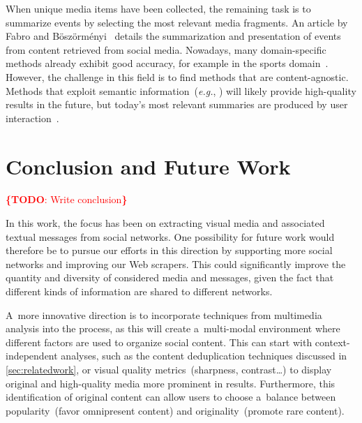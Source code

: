 \documentclass{acm_proc_article-sp}
\let\oldemph\emph
\renewcommand{\emph}[1]{\oldemph{\fontsize{9}{9}\selectfont #1}}
\newcommand{\todo}[1]{\noindent\textcolor{red}{{\bf \{TODO}: #1{\bf \}}}}
\begin{document}
When unique media items have been collected, the remaining task is to summarize events by selecting the most relevant media fragments.
An article by Fabro and B\"osz\"orm\'enyi~\cite{Fabro:MMM12} details the summarization and presentation of events from content retrieved from social media.
Nowadays, many domain-specific methods already exhibit good accuracy, for example in the sports domain~\cite{Li1,Li2}.
However, the challenge in this field is to find methods that are content-agnostic.
Methods that exploit semantic information~(\emph{e.g.}, \cite{Chen}) will likely provide high-quality results in the future,
but today's most relevant summaries are produced by user interaction~\cite{Olsen}.


\section{Conclusion and Future Work}                                        \label{sec:conclusion}
\todo{Write conclusion}

In this work, the focus has been on extracting visual media and associated textual messages from social networks.
One possibility for future work would therefore be to pursue our efforts in this direction by supporting more social networks and improving our Web scrapers.
This could significantly improve the quantity and diversity of considered media and messages,
given the fact that different kinds of information are shared to different networks.

A~more innovative direction is to incorporate techniques from multimedia analysis into the process,
as this will create a~multi-modal environment where different factors are used to organize social content.
This can start with context-independent analyses, such as the content deduplication techniques discussed in \autoref{sec:relatedwork},
or visual quality metrics~(sharpness, contrast\ldots) to display original and high-quality media more prominent in results.
Furthermore, this identification of original content can allow users to choose a~balance between popularity~(favor omnipresent content) and originality~(promote rare content).
\end{document}
